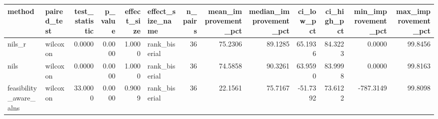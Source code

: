 \begin{tabular}{llrrrlrrrrrrr}
\toprule
method & paired_test & test_statistic & p_value & effect_size & effect_size_name & n_pairs & mean_improvement_pct & median_improvement_pct & ci_low_pct & ci_high_pct & min_improvement_pct & max_improvement_pct \\
\midrule
nils_r & wilcoxon & 0.0000 & 0.0000 & 1.0000 & rank_biserial & 36 & 75.2306 & 89.1285 & 65.1936 & 84.3223 & 0.0000 & 99.8456 \\
nils & wilcoxon & 0.0000 & 0.0000 & 1.0000 & rank_biserial & 36 & 74.5858 & 90.3261 & 63.9590 & 83.9998 & 0.0000 & 99.8163 \\
feasibility_aware_alns & wilcoxon & 33.0000 & 0.0000 & 0.9009 & rank_biserial & 36 & 22.1561 & 75.7167 & -51.7392 & 73.6122 & -787.3149 & 99.8098 \\
\bottomrule
\end{tabular}
